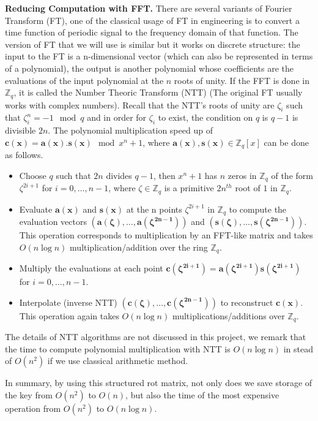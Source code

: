 \begin{description}
  \textbf{Reducing Computation with FFT.} There are several variants of Fourier
  Transform (FT), one of the classical usage of FT in engineering is to convert
  a time function of periodic signal to the frequency domain of that
  function. The version of FT that we will use is similar but it works on
  discrete structure: the input to the FT is a n-dimensional vector (which can
  also be represented in terms of a polynomial), the output is another
  polynomial whose coefficients are the evaluations of the input polynomial at
  the $n$ roots of unity.  If the FFT is done in $\mathbb{Z}_q$, it is called
  the Number Theoric Transform (NTT) (The original FT usually works with complex
  numbers). Recall that the NTT's roots of unity are $\zeta_i$ such that
  $\zeta_i^n = -1\mod q$ and in order for $\zeta_i$ to exist, the condition on
  $q$ is $q -1$ is divisible $2n$.  The polynomial multiplication speed up of
  $\mathbf{c(x) = a(x).s(x)} \mod x^n +1$, where
  $\mathbf{a(x),s(x)} \in \mathbb{Z}_q[x]$ can be done as follows.
  \begin{itemize}
  \item Choose $q$ such that $2n$ divides $q-1$, then $x^n + 1$ has $n$ zeros in
    $\mathbb{Z}_q$ of the form $\zeta^{2i + 1}$ for $i = 0,\dots,n-1$, where
    $\zeta \in \mathbb{Z}_q$ is a primitive $2n^{th}$ root of $1$ in
    $\mathbb{Z}_q$.
  \item Evaluate $\mathbf{a(x)}$ and $\mathbf{s(x)}$ at the n points
    $\zeta^{2i + 1}$ in $\mathbb{Z}_q$ to compute the evaluation vectors
    $\mathbf{(a(\zeta),\dots,a(\zeta^{2n-1}))}$ and
    $\mathbf{(s(\zeta), \dots, s(\zeta^{2n - 1}))}$. This operation corresponds
    to multiplication by an FFT-like matrix and takes $O(n \log n)$
    multiplication/addition over the ring $\mathbb{Z}_q$.
  \item Multiply the evaluations at each point
    $\mathbf{c(\zeta^{2i + 1}) = a(\zeta^{2i+1})s(\zeta^{2i+1})}$ for
    $i = 0,\dots,n-1$.
  \item Interpolate (inverse NTT) $\mathbf{(c(\zeta), \dots, c(\zeta^{2n-1}))}$
    to reconstruct $\mathbf{c(x)}$. This operation again takes $O(n\log n)$
    multiplications/additions over $\mathbb{Z}_q$.
  \end{itemize}
  The details of NTT algorithms are not discussed in this project, we remark
  that the time to compute polynomial multiplication with NTT is $O(n \log n)$
  in stead of $O(n^2)$ if we use classical arithmetic method.

  In summary, by using this structured rot matrix, not only does we save storage
  of the key from $O(n^2)$ to $O(n)$, but also the time of the most expensive
  operation from $O(n^2)$ to $O(n\log n)$.
\end{description}

